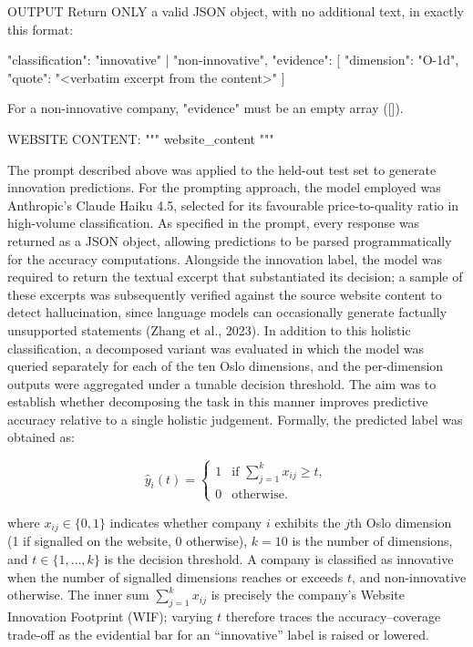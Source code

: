 \documentclass[runningheads]{llncs}
\begin{document}
OUTPUT
Return ONLY a valid JSON object, with no additional text, in exactly this format:

{
  "classification": "innovative" | "non-innovative",
  "evidence": [
    { "dimension": "O-1d", "quote": "<verbatim excerpt from the content>" }
  ]
}

For a non-innovative company, "evidence" must be an empty array ([]).

WEBSITE CONTENT:
"""
{website_content}
"""


The prompt described above was applied to the held-out test set to generate innovation predictions. For the prompting approach, the model employed was Anthropic's Claude Haiku 4.5, selected for its favourable price-to-quality ratio in high-volume classification. As specified in the prompt, every response was returned as a JSON object, allowing predictions to be parsed programmatically for the accuracy computations. Alongside the innovation label, the model was required to return the textual excerpt that substantiated its decision; a sample of these excerpts was subsequently verified against the source website content to detect hallucination, since language models can occasionally generate factually unsupported statements (Zhang et al., 2023).
In addition to this holistic classification, a decomposed variant was evaluated in which the model was queried separately for each of the ten Oslo dimensions, and the per-dimension outputs were aggregated under a tunable decision threshold. The aim was to establish whether decomposing the task in this manner improves predictive accuracy relative to a single holistic judgement. Formally, the predicted label was obtained as:

\begin{equation}
\hat{y}_i(t) =
\left\{
\begin{array}{ll}
1 & \text{if } \sum_{j=1}^{k} x_{ij} \ge t, \\
0 & \text{otherwise.}
\end{array}
\right.
\label{eq:threshold}
\end{equation}

where $x_{ij}\in\{0,1\}$ indicates whether company $i$ exhibits the $j$th Oslo dimension (1 if signalled on the website, 0 otherwise), $k=10$ is the number of dimensions, and $t\in\{1,\dots,k\}$ is the decision threshold. A company is classified as innovative when the number of signalled dimensions reaches or exceeds $t$, and non-innovative otherwise. The inner sum $\sum_{j=1}^{k} x_{ij}$ is precisely the company's Website Innovation Footprint (WIF); varying $t$ therefore traces the accuracy--coverage trade-off as the evidential bar for an ``innovative'' label is raised or lowered.
\end{document}
